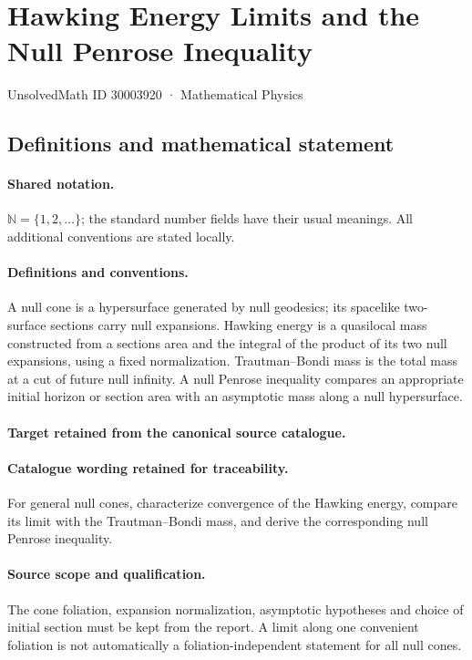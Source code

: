 \documentclass[11pt]{article}
\begin{document}
\setcounter{section}{30003919}
\section{Hawking Energy Limits and the Null Penrose Inequality}\label{30003920}
{\small UnsolvedMath ID 30003920 · Mathematical Physics}
\subsection{Definitions and mathematical statement}

\paragraph{Shared notation.}$\mathbb N=\{1,2,\ldots\}$; the standard number fields have their usual meanings. All additional conventions are stated locally.


\paragraph{Definitions and conventions.}
A null cone is a hypersurface generated by null geodesics; its spacelike two-surface sections carry null expansions. Hawking energy is a quasilocal mass constructed from a section\textquotesingle s area and the integral of the product of its two null expansions, using a fixed normalization. Trautman--Bondi mass is the total mass at a cut of future null infinity. A null Penrose inequality compares an appropriate initial horizon or section area with an asymptotic mass along a null hypersurface.

\paragraph{Target retained from the canonical source catalogue.}
\paragraph{Catalogue wording retained for traceability.}
For general null cones, characterize convergence of the Hawking energy, compare its limit with the Trautman–Bondi mass, and derive the corresponding null Penrose inequality.

\paragraph{Source scope and qualification.}
The cone foliation, expansion normalization, asymptotic hypotheses and choice of initial section must be kept from the report. A limit along one convenient foliation is not automatically a foliation-independent statement for all null cones.
\end{document}
